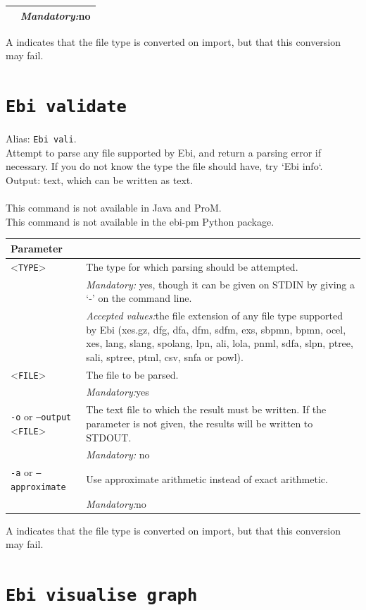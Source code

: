 {\begin{tabularx}{\linewidth}{lX}
&\textit{Mandatory:}\quad no\\
\bottomrule
\end{tabularx}
A \textdagger{} indicates that the file type is converted on import, but that this conversion may fail.
\clearpage\section{\texttt{Ebi validate}}
\label{command:Ebi validate}
Alias: \texttt{Ebi vali}.\\
Attempt to parse any file supported by Ebi, and return a parsing error if necessary.
        If you do not know the type the file should have, try `Ebi info`.\\
\noindent Output: text, which can be written as  text.\\
\\This command is not available in Java and ProM.
\\This command is not available in the ebi-pm Python package.
\begin{tabularx}{\linewidth}{lX}
\toprule
Parameter \\\midrule
<\texttt{TYPE}>&The type for which parsing should be attempted.\\
&\textit{Mandatory:} \quad yes, though it can be given on STDIN by giving a `-' on the command line.\\
&\textit{Accepted values:}\quad the file extension of any file type supported by Ebi (xes.gz, dfg, dfa, dfm, sdfm, exs, sbpmn, bpmn, ocel, xes, lang, slang, spolang, lpn, ali, lola, pnml, sdfa, slpn, ptree, sali, sptree, ptml, csv, snfa or powl).\\
<\texttt{FILE}>
&The file to be parsed.\\
&\textit{Mandatory:}\quad yes\\
\texttt{-o} or \texttt{--output} <\texttt{FILE}> &
The text file to which the result must be written. If the parameter is not given, the results will be written to STDOUT.\\
&\textit{Mandatory:} \quad no\\
\texttt{-a} or \texttt{--approximate} & Use approximate arithmetic instead of exact arithmetic.\\
&\textit{Mandatory:}\quad no\\
\bottomrule
\end{tabularx}
A \textdagger{} indicates that the file type is converted on import, but that this conversion may fail.
\clearpage\section{\texttt{Ebi visualise graph}}
}
